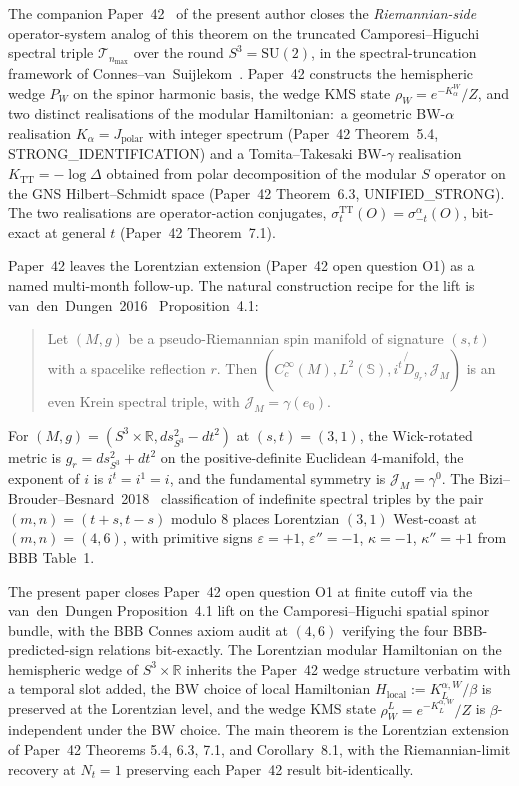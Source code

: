 \documentclass[11pt,a4paper]{article}
\theoremstyle{plain}
\theoremstyle{definition}
\newcommand{\nmax}{n_{\max}}
\newcommand{\Nt}{N_t}
\newcommand{\sthree}{S^{3}}
\newcommand{\Tcal}{\mathcal{T}}
\newcommand{\R}{\mathbb{R}}
\newcommand{\SU}{\mathrm{SU}}
\newcommand{\KL}{K_{L}}
\newcommand{\TT}{\mathrm{TT}}
\begin{document}
The companion Paper~42~\cite{paper42} of the present author closes the
\emph{Riemannian-side} operator-system analog of this theorem on the
truncated Camporesi--Higuchi~\cite{camporesi_higuchi1996} spectral
triple $\Tcal_{\nmax}$ over the round $\sthree = \SU(2)$, in the
spectral-truncation framework of
Connes--van~Suijlekom~\cite{connes_vs2021}. Paper~42 constructs the
hemispheric wedge $P_W$ on the spinor harmonic basis, the wedge KMS
state $\rho_W = e^{-K_\alpha^W}/Z$, and two distinct realisations of
the modular Hamiltonian:\ a geometric BW-$\alpha$ realisation
$K_\alpha = J_{\mathrm{polar}}$ with integer spectrum
(Paper~42 Theorem~5.4, STRONG\_IDENTIFICATION) and a
Tomita--Takesaki BW-$\gamma$ realisation $K_\TT = -\log \Delta$ obtained
from polar decomposition of the modular $S$ operator on the
GNS Hilbert--Schmidt space (Paper~42 Theorem~6.3, UNIFIED\_STRONG).
The two realisations are operator-action conjugates,
$\sigma_t^\TT(O) = \sigma_{-t}^\alpha(O)$, bit-exact at general $t$
(Paper~42 Theorem~7.1).

Paper~42 leaves the Lorentzian extension (Paper~42 open question O1)
as a named multi-month follow-up. The natural construction recipe
for the lift is van~den~Dungen~2016~\cite{vandungen2016} Proposition~4.1:

\begin{quote}
Let $(M, g)$ be a pseudo-Riemannian spin manifold of signature
$(s, t)$ with a spacelike reflection $r$. Then
$(C^\infty_c(M), L^2(\mathbb{S}), i^t \not{\!\!D}_{g_r}, \mathcal{J}_M)$
is an even Krein spectral triple, with
$\mathcal{J}_M = \gamma(e_0)$.
\end{quote}

For $(M, g) = (\sthree \times \R, ds^2_{\sthree} - dt^2)$ at
$(s, t) = (3, 1)$, the Wick-rotated metric is
$g_r = ds^2_{\sthree} + dt^2$ on the positive-definite Euclidean
4-manifold, the exponent of $i$ is $i^t = i^1 = i$, and the
fundamental symmetry is $\mathcal{J}_M = \gamma^0$. The
Bizi--Brouder--Besnard~2018~\cite{bizi_brouder_besnard2018}
classification of indefinite spectral triples by the pair
$(m, n) = (t + s, t - s)$ modulo 8 places Lorentzian $(3, 1)$
West-coast at $(m, n) = (4, 6)$, with primitive signs
$\varepsilon = +1$, $\varepsilon'' = -1$, $\kappa = -1$,
$\kappa'' = +1$ from BBB Table~1.

The present paper closes Paper~42 open question O1 at finite cutoff
via the van~den~Dungen Proposition~4.1 lift on the Camporesi--Higuchi
spatial spinor bundle, with the BBB Connes axiom audit at $(4, 6)$
verifying the four BBB-predicted-sign relations bit-exactly. The
Lorentzian modular Hamiltonian on the hemispheric wedge of $\sthree
\times \R$ inherits the Paper~42 wedge structure verbatim with a
temporal slot added, the BW choice of local Hamiltonian
$H_{\mathrm{local}} := \KL^{\alpha, W} / \beta$ is preserved at the
Lorentzian level, and the wedge KMS state $\rho_W^L = e^{-\KL^{\alpha,
W}}/Z$ is $\beta$-independent under the BW choice. The main theorem is
the Lorentzian extension of Paper~42 Theorems 5.4, 6.3, 7.1, and
Corollary~8.1, with the Riemannian-limit recovery at $\Nt = 1$
preserving each Paper~42 result bit-identically.
\end{document}
